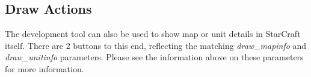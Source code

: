 \subsection{Draw Actions}
The development tool can also be used to show map or unit details in StarCraft itself. There are 2 buttons to this end, reflecting the matching \textit{draw\_mapinfo} and \textit{draw\_unitinfo} parameters. Please see the information above on these parameters for more information.